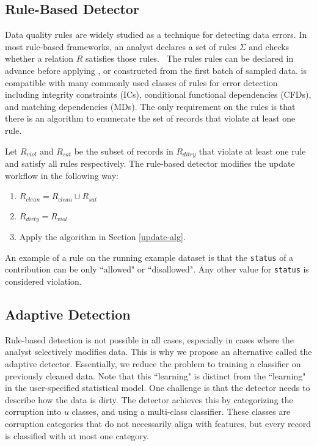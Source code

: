 \subsection{Rule-Based Detector}\label{rule-det}
Data quality rules are widely studied as a technique for detecting data errors.
In most rule-based frameworks, an analyst declares a set of rules $\Sigma$ and checks whether a relation $R$ satisfies those rules.  The rules rules can be declared in advance before applying \sys, or constructed from the first batch of sampled data.
\sys is compatible with many commonly used classes of rules for error detection including integrity constraints (ICs), conditional functional dependencies (CFDs), and matching dependencies (MDs).
The only requirement on the rules is that there is an algorithm to enumerate the set of records that violate at least one rule.

Let $R_{viol}$ and $R_{sat}$ be the subset of records in $R_{ditry}$ that violate at least one rule and satisfy all rules respectively.
The rule-based detector modifies the update workflow in the following way:
\begin{enumerate}
\item $R_{clean} = R_{clean} \cup R_{sat}$
\item $R_{dirty} = R_{viol}$
\item Apply the algorithm in Section \ref{update-alg}.
\end{enumerate}

\begin{example}\label{detex1}
An example of a rule on the running example dataset is that the \texttt{status} of
a contribution can be only ``allowed" or ``disallowed".
Any other value for \texttt{status} is considered violation.
\end{example}

\vspace{2em}

\subsection{Adaptive Detection}
Rule-based detection is not possible in all cases, especially in cases where the analyst selectively modifies data.
This is why we propose an alternative called the adaptive detector.
Essentially, we reduce the problem to training a classifier on previously cleaned data.
Note that this ``learning" is distinct from the ``learning" in the user-specified statistical model.
One challenge is that the detector needs to describe how the data is dirty.
The detector achieves this by categorizing the corruption into $u$ classes, and using a multi-class classifier.
These classes are corruption categories that do not necessarily align with features, but every record is classified with at most one category.

